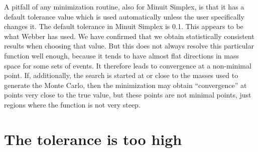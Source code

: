 \documentclass[twoside,english]{uiofysmaster}
\begin{document}
A pitfall of any minimization routine, also for Minuit Simplex, is that it has a default tolerance value which is used automatically unless the user specifically changes it. The default tolerance in Minuit Simplex is 0.1. This appears to be what Webber has used. We have confirmed that we obtain statistically consistent results when choosing that value. But this does not always resolve this particular function well enough, because it tends to have almost flat directions in mass space for some sets of events. It therefore leads to convergence at a non-minimal point. If, additionally, the search is started at or close to the masses used to generate the Monte Carlo, then the minimization may obtain ``convergence'' at points very close to the true value, but these points are not minimal points, just regions where the function is not very steep.

\section{The tolerance is too high}
\end{document}
